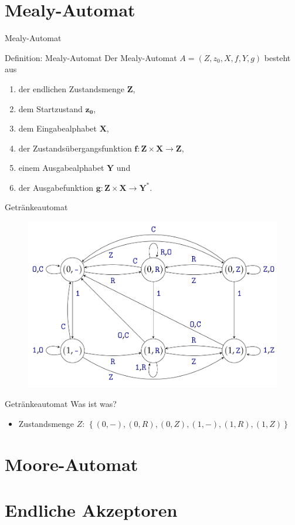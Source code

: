 \section{Mealy-Automat}
\begin{frame}{Mealy-Automat}
    \begin{block}{Definition: Mealy-Automat}
        Der Mealy-Automat $A = \left( Z, z_0, X, f, Y, g \right)$ besteht aus
        \begin{enumerate}
            \item der endlichen Zustandsmenge $\mathbf{Z}$,
            \item dem Startzustand $\mathbf{z_0}$,
            \item dem Eingabealphabet $\mathbf{X}$,
            \item der Zustandsübergangsfunktion $\mathbf{f: Z\times X \rightarrow Z}$,
            \item einem Ausgabealphabet $\mathbf{Y}$ und
            \item der Ausgabefunktion $\mathbf{g: Z\times X \rightarrow Y^*}$.
        \end{enumerate}
    \end{block}
\end{frame}
\begin{frame}{Getränkeautomat}
    \begin{figure}[htbp]
        \centering
        \includegraphics[width=\textwidth,height=\textheight,keepaspectratio]{graphics/10/getraenke.png}
    \end{figure}
\end{frame}
\begin{frame}{Getränkeautomat}
    Was ist was?
    \begin{itemize}
        \item Zustandsmenge $Z$: $\left\{ \left( 0,- \right), \left( 0,R \right), \left( 0,Z \right), \left( 1,- \right), \left( 1,R \right), \left( 1,Z \right) \right\}$
    \end{itemize}
\end{frame}

\section{Moore-Automat}

\section{Endliche Akzeptoren}

